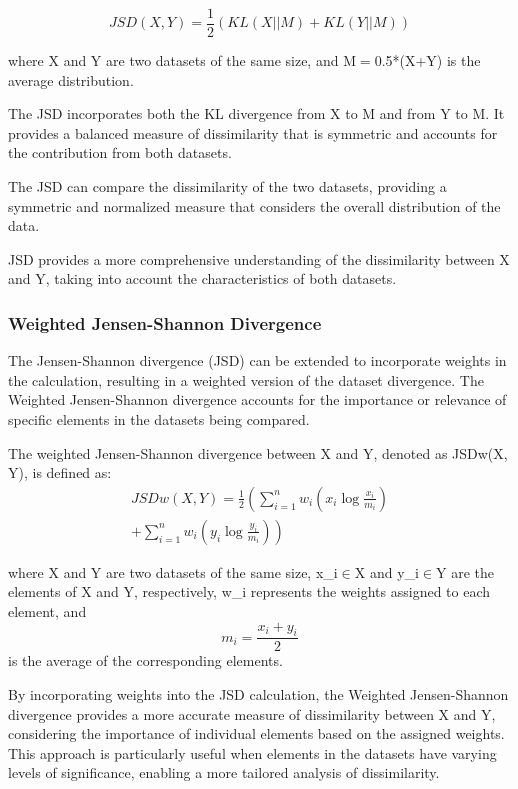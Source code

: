 \[JSD(X, Y) = \frac{1}{2} \left( KL(X || M)
  + KL(Y || M) \right)\]

where X and Y are two datasets of the same size, and M$=$0.5*(X+Y) is the average distribution.

The JSD incorporates both the KL divergence from X to M and from Y to M. It provides a balanced measure of dissimilarity that is symmetric and accounts for the contribution from both datasets.

The JSD can compare the dissimilarity of the two datasets, providing a symmetric and normalized measure that considers the overall distribution of the data.

JSD provides a more comprehensive understanding of the dissimilarity between X and Y, taking into account the characteristics of both datasets.

\subsubsection{Weighted Jensen-Shannon Divergence}

The Jensen-Shannon divergence (JSD) can be extended to incorporate weights in the calculation, resulting in a weighted version of the dataset divergence. The Weighted Jensen-Shannon divergence accounts for the importance or relevance of specific elements in the datasets being compared.

The weighted Jensen-Shannon divergence between X and Y, denoted as JSDw(X, Y), is defined as:
\begin{align*}
  JSDw(X, Y) = \frac{1}{2} \left( \sum_{i=1}^{n} w_i \left( x_i \log \frac{x_i}{m_i} \right) \right. \\
  \left. + \sum_{i=1}^{n} w_i \left( y_i \log \frac{y_i}{m_i} \right) \right)
\end{align*}

where X and Y are two datasets of the same size, x\_i$\in$X and y\_i$\in$Y are the elements of X and Y, respectively, w\_i represents the weights assigned to each element, and \[m_i = \frac{{x_i + y_i}}{2}\] is the average of the corresponding elements.

By incorporating weights into the JSD calculation, the Weighted Jensen-Shannon divergence provides a more accurate measure of dissimilarity between X and Y, considering the importance of individual elements based on the assigned weights. This approach is particularly useful when elements in the datasets have varying levels of significance, enabling a more tailored analysis of dissimilarity.

